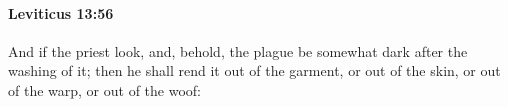 
		\paragraph{Leviticus 13:56} %
			\label{LEVITICUS-13-56}

			And if the priest look, and, behold, the plague be somewhat dark after the washing of it; then he shall rend it out of the garment, or out of the skin, or out of the warp, or out of the woof:


